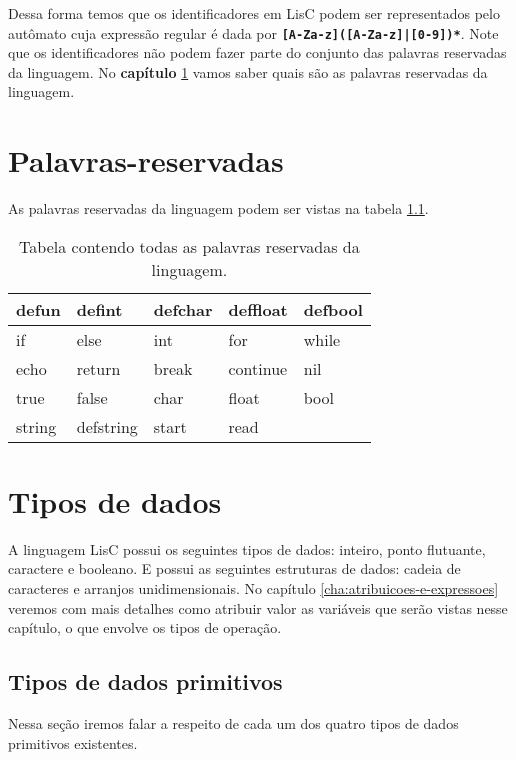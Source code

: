 \documentclass[
  12pt,				%
  oneside,			%
  a4paper,			%
  english,			%
  french,				%
  spanish,			%
  brazil,				%
]{abntex2}
\begin{document}
Dessa forma temos que os identificadores em LisC podem ser representados pelo
autômato cuja expressão regular é dada por
\textbf{\lstinline[]{[A-Za-z]([A-Za-z]|[0-9])*}}. Note que os
identificadores não podem fazer parte do conjunto das palavras
reservadas da linguagem. No \textbf{capítulo}
\ref{cha:palavras-reservadas} vamos saber quais são as palavras
reservadas da linguagem.

\chapter{Palavras-reservadas}
\label{cha:palavras-reservadas}
As palavras reservadas da linguagem podem ser vistas na tabela
\ref{tab:palavras-reservadas}.

\begin{table}[H]
  \centering
  \caption{Tabela contendo todas as palavras reservadas da linguagem.}
  \label{tab:palavras-reservadas}
  \begin{tabular}{|l|l|l|l|l|}
    \hline
    defun & defint & defchar & deffloat & defbool \\ \hline
    if&  else& int &  for& while \\ \hline
    echo&  return&  break&  continue& nil \\ \hline
    true&  false& char& float & bool\\ \hline
    string&  defstring& start& read &\\ \hline
  \end{tabular}
\end{table}

\chapter{Tipos de dados}
\label{cha:tipos-de-dados}

A linguagem LisC possui os seguintes tipos de dados: inteiro, ponto
flutuante, caractere e booleano. E possui as seguintes estruturas de
dados: cadeia de caracteres e arranjos unidimensionais. No capítulo
\ref{cha:atribuicoes-e-expressoes} veremos com mais detalhes
como atribuir valor as variáveis que serão vistas nesse capítulo, o
que envolve os tipos de operação.

\section{Tipos de dados primitivos}
\label{sec:tipos-de-dados-primitivos}

Nessa seção iremos falar a respeito de cada um dos quatro tipos de
dados primitivos existentes.
\end{document}
